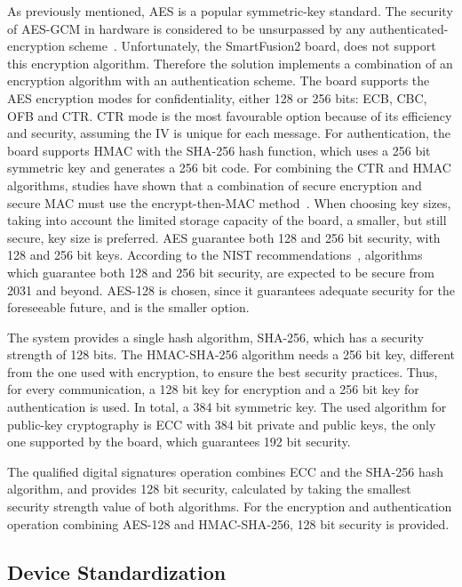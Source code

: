 As previously mentioned, \ac{AES} is a popular symmetric-key standard. The security of \ac{AES}-\ac{GCM} in hardware is considered to be unsurpassed by any authenticated-encryption scheme~\cite{aesmodes}.
Unfortunately, the SmartFusion2 board, does not support this encryption algorithm. Therefore the solution implements a combination of an encryption algorithm with an authentication scheme. The board supports the \ac{AES} encryption modes for confidentiality, either 128 or 256 bits: \ac{ECB}, \ac{CBC}, \ac{OFB} and \ac{CTR}. CTR mode is the most favourable option because of its efficiency and security, assuming the IV is unique for each message.
For authentication, the board supports \ac{HMAC} with the \ac{SHA}-256 hash function, which uses a 256 bit symmetric key and generates a 256 bit code. For combining the CTR and HMAC algorithms, studies have shown that a combination of secure encryption and secure MAC must use the encrypt-then-MAC method~\cite{encryptmacorder}.
When choosing key sizes, taking into account the limited storage capacity of the board, a smaller, but still secure, key size is preferred. \ac{AES} guarantee both 128 and 256 bit security, with 128 and 256 bit keys. According to the \ac{NIST} recommendations~\cite{nistRecommendations}, algorithms which guarantee both 128 and 256 bit security, are expected to be secure from 2031 and beyond. \ac{AES}-128 is chosen, since it guarantees adequate security for the foreseeable future, and is the smaller option.

The system provides a single hash algorithm, \ac{SHA}-256, which has a security strength of 128 bits.
The \ac{HMAC}-\ac{SHA}-256 algorithm needs a 256 bit key, different from the one used with encryption, to ensure the best security practices. Thus, for every communication, a 128 bit key for encryption and a 256 bit key for authentication is used. In total, a 384 bit symmetric key.
The used algorithm for public-key cryptography is \ac{ECC} with 384 bit private and public keys, the only one supported by the board, which guarantees 192 bit security.

The qualified digital signatures operation combines \ac{ECC} and the \ac{SHA}-256 hash algorithm, and provides 128 bit security, calculated by taking the smallest security strength value of both algorithms. For the encryption and authentication operation combining \ac{AES}-128 and \ac{HMAC}-\ac{SHA}-256, 128 bit security is provided.

\subsection{Device Standardization}\label{chap:implementation:tools:standardization}

